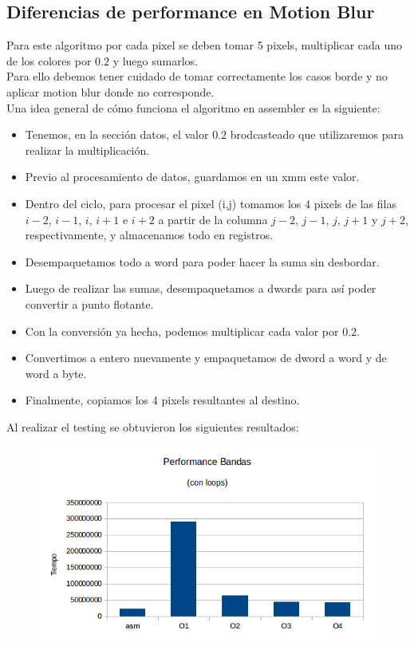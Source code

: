 \documentclass[a4paper]{article}
\begin{document}
\subsection{Diferencias de performance en Motion Blur}
Para este algoritmo por cada pixel se deben tomar 5 pixels, multiplicar cada uno de los colores por $0.2$ y luego sumarlos.
\\
Para ello debemos tener cuidado de tomar correctamente los casos borde y no aplicar motion blur donde no corresponde.
\\
Una idea general de cómo funciona el algoritmo en assembler es la siguiente:

\begin{itemize}
\item  Tenemos, en la sección datos, el valor $0.2$ brodcasteado que utilizaremos para realizar la multiplicación.
\item  Previo al procesamiento de datos, guardamos en un xmm este valor.
\item  Dentro del ciclo, para procesar el pixel (i,j) tomamos los 4 pixels de las filas $i-2$, $i-1$, $i$, $i+1$ e $i+2$ a partir de la columna $j-2$, $j-1$, $j$, $j+1$ y $j+2$, respectivamente, y almacenamos todo en registros.
\item  Desempaquetamos todo a word para poder hacer la suma sin desbordar.
\item  Luego de realizar las sumas, desempaquetamos a dwords para así poder convertir a punto flotante.
\item  Con la conversión ya hecha, podemos multiplicar cada valor por $0.2$.
\item  Convertimos a entero nuevamente y empaquetamos de dword a word y de word a byte.
\item  Finalmente, copiamos los 4 pixels resultantes al destino.
\end{itemize}

Al realizar el testing se obtuvieron los siguientes resultados:

\begin{figure}[h!]
  \begin{center}
  \includegraphics[scale=0.66]{Graficos1.4/ban/PSO.png}
  \label{nombreparareferenciar11}
  \end{center}
\end{figure}
\end{document}
